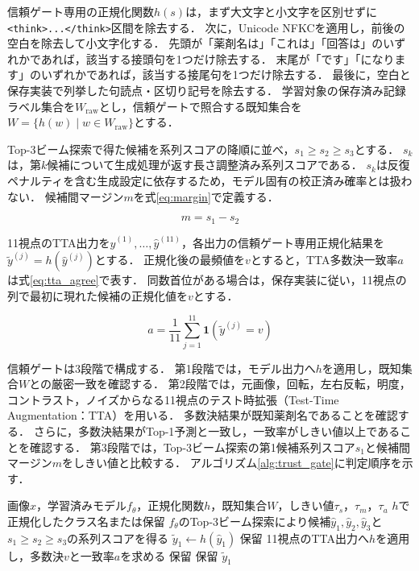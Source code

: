 \documentclass[uplatex,dvipdfmx]{jsarticle}
\begin{document}
信頼ゲート専用の正規化関数$h(s)$は，まず大文字と小文字を区別せずに\texttt{<think>...</think>}区間を除去する．
次に，Unicode NFKCを適用し，前後の空白を除去して小文字化する．
先頭が「薬剤名は」「これは」「回答は」のいずれかであれば，該当する接頭句を1つだけ除去する．
末尾が「です」「になります」のいずれかであれば，該当する接尾句を1つだけ除去する．
最後に，空白と保存実装で列挙した句読点・区切り記号を除去する．
学習対象の保存済み記録ラベル集合を$W_{\mathrm{raw}}$とし，信頼ゲートで照合する既知集合を$W=\{h(w)\mid w\in W_{\mathrm{raw}}\}$とする．

Top-3ビーム探索で得た候補を系列スコアの降順に並べ，$s_1 \geq s_2 \geq s_3$とする．
$s_k$は，第$k$候補について生成処理が返す長さ調整済み系列スコアである．
$s_k$は反復ペナルティを含む生成設定に依存するため，モデル固有の校正済み確率とは扱わない．
候補間マージン$m$を式\eqref{eq:margin}で定義する．

\begin{equation}
  m = s_1 - s_2
  \label{eq:margin}
\end{equation}

11視点のTTA出力を$\hat{y}^{(1)},\ldots,\hat{y}^{(11)}$，各出力の信頼ゲート専用正規化結果を$\tilde{y}^{(j)}=h(\hat{y}^{(j)})$とする．
正規化後の最頻値を$v$とすると，TTA多数決一致率$a$は式\eqref{eq:tta_agree}で表す．
同数首位がある場合は，保存実装に従い，11視点の列で最初に現れた候補の正規化値を$v$とする．

\begin{equation}
  a = \frac{1}{11}\sum_{j=1}^{11}\mathbf{1}\!\left(\tilde{y}^{(j)} = v\right)
  \label{eq:tta_agree}
\end{equation}

信頼ゲートは3段階で構成する．
第1段階では，モデル出力へ$h$を適用し，既知集合$W$との厳密一致を確認する．
第2段階では，元画像，回転，左右反転，明度，コントラスト，ノイズからなる11視点のテスト時拡張（Test-Time Augmentation：TTA）を用いる．
多数決結果が既知薬剤名であることを確認する．
さらに，多数決結果がTop-1予測と一致し，一致率がしきい値以上であることを確認する．
第3段階では，Top-3ビーム探索の第1候補系列スコア$s_1$と候補間マージン$m$をしきい値と比較する．
アルゴリズム\ref{alg:trust_gate}に判定順序を示す．

\begin{algorithm}[H]
  \caption{信頼ゲートによる回答と保留の判定}
  \label{alg:trust_gate}
  \small
  \begin{algorithmic}[1]
    \REQUIRE 画像$x$，学習済みモデル$f_\theta$，正規化関数$h$，既知集合$W$，しきい値$\tau_s$，$\tau_m$，$\tau_a$
    \ENSURE $h$で正規化したクラス名または保留
    \STATE $f_\theta$のTop-3ビーム探索により候補$\hat{y}_1,\hat{y}_2,\hat{y}_3$と$s_1 \geq s_2 \geq s_3$の系列スコアを得る
    \STATE $\tilde{y}_1 \gets h(\hat{y}_1)$
      \RETURN 保留
    \ENDIF
    \STATE 11視点のTTA出力へ$h$を適用し，多数決$v$と一致率$a$を求める
      \RETURN 保留
    \ENDIF
      \RETURN 保留
    \ENDIF
    \RETURN $\tilde{y}_1$
  \end{algorithmic}
\end{algorithm}
\end{document}
